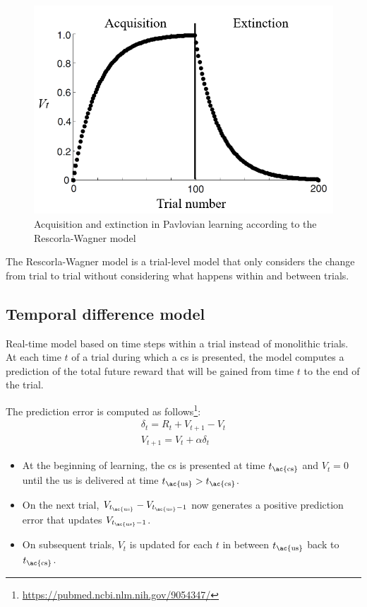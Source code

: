 \begin{figure}[H]
    \centering
    \includegraphics[width=0.4\linewidth]{./img/rescorla_wagner_curve.png}
    \caption{Acquisition and extinction in Pavlovian learning according to the Rescorla-Wagner model}
\end{figure}

\begin{remark}
    The Rescorla-Wagner model is a trial-level model that only considers the change from trial to trial
    without considering what happens within and between trials.
\end{remark}


\subsection{Temporal difference model}

Real-time model based on time steps within a trial instead of monolithic trials.
At each time $t$ of a trial during which a \ac{cs} is presented,
the model computes a prediction of the total future reward that will be gained from time $t$ to the end of the trial.

The prediction error is computed as follows\footnote{\url{https://pubmed.ncbi.nlm.nih.gov/9054347/}}:
\begin{gather*}
    \delta_t = R_t + V_{t+1} - V_t \\
    V_{t+1} = V_t + \alpha \delta_t
\end{gather*}

\begin{itemize}
    \item At the beginning of learning, the \ac{cs} is presented at time $t_\text{\ac{cs}}$
        and $V_t = 0$ until the \ac{us} is delivered at time $t_\text{\ac{us}} > t_\text{\ac{cs}}$.
    \item On the next trial, $V_{t_\text{\ac{us}}} - V_{t_\text{\ac{us}} - 1}$ now generates a positive prediction error that updates $V_{t_\text{\ac{us}} - 1}$.
    \item On subsequent trials, $V_t$ is updated for each $t$ in between $t_\text{\ac{us}}$ back to $t_\text{\ac{cs}}$.
\end{itemize}

